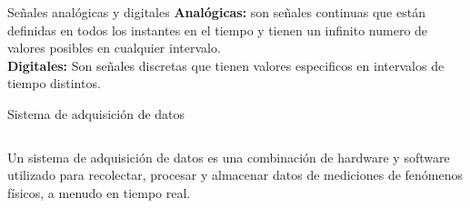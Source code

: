 \documentclass[aspectratio=169]{beamer}
\begin{document}
\begin{frame}[t]{Señales analógicas y digitales}
\textbf{Analógicas:} son señales continuas que están definidas en todos los instantes en el tiempo y tienen un infinito numero de valores posibles en cualquier intervalo.\\[8pt]
\textbf{Digitales:} Son señales discretas que tienen valores especificos en intervalos de tiempo distintos.

\end{frame}

\begin{frame}{Sistema de adquisición de datos}
\begin{columns}[c, onlytextwidth]
    \begin{column}{0.4\textwidth}
        Un sistema de adquisición de datos es una combinación de hardware y software utilizado para recolectar, procesar y almacenar datos de mediciones de fenómenos físicos, a menudo en tiempo real.
    \end{column}
\end{columns}
\end{frame}
\end{document}
